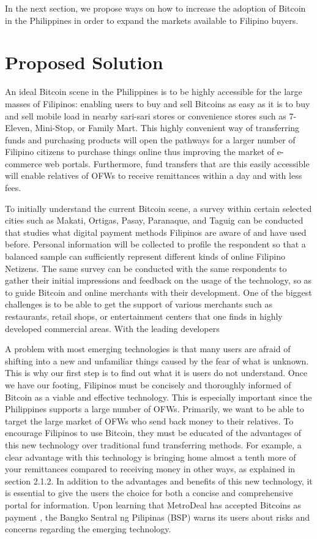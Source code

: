 \documentclass{acm_proc_article-sp}
\begin{document}
In the next section, we propose ways on how to increase the adoption of Bitcoin in the Philippines in order to expand the markets available to Filipino buyers.

\section{Proposed Solution}

An ideal Bitcoin scene in the Philippines is to be highly accessible for the large masses of Filipinos: enabling users to buy and sell Bitcoins as easy as it is to buy and sell mobile load in nearby sari-sari stores or convenience stores such as 7-Eleven, Mini-Stop, or Family Mart. This highly convenient way of transferring funds and purchasing products will open the pathways for a larger number of Filipino citizens to purchase things online thus improving the market of e-commerce web portals. Furthermore, fund transfers that are this easily accessible will enable relatives of OFWs to receive remittances within a day and with less fees.

To initially understand the current Bitcoin scene, a survey within certain selected cities such as Makati, Ortigas, Pasay, Paranaque, and Taguig can be conducted that studies what digital payment methods Filipinos are aware of and have used before. Personal information will be collected to profile the respondent so that a balanced sample can sufficiently represent different kinds of online Filipino Netizens.  The same survey can be conducted with the same respondents to gather their initial impressions and feedback on the usage of the technology, so as to guide Bitcoin and online merchants with their development. One of the biggest challenges is to be able to get the support of various merchants such as restaurants, retail shops, or entertainment centers that one finds in highly developed commercial areas. With the leading developers

A problem with most emerging technologies is that many users are afraid of shifting into a new and unfamiliar things caused by the fear of what is unknown. This is why our first step is to find out what it is users do not understand. Once we have our footing, Filipinos must be concisely and thoroughly informed of Bitcoin as a viable and effective technology. This is especially important since the Philippines supports a large number of OFWs.  Primarily, we want to be able to target the large market of OFWs who send back money to their relatives. To encourage Filipinos to use Bitcoin, they must be educated of the advantages of this new technology over traditional fund transferring methods. For example, a clear advantage with this technology is bringing home almost a tenth more of your remittances compared to receiving money in other ways, as explained in section 2.1.2. In addition to the advantages and benefits of this new technology, it is essential to give the users the choice for both a concise and comprehensive portal for information. Upon learning that MetroDeal has accepted Bitcoins as payment \cite{Coins.ph:06292014}, the Bangko Sentral ng Pilipinas (BSP) warns its users about risks and concerns regarding the emerging technology.
\end{document}
